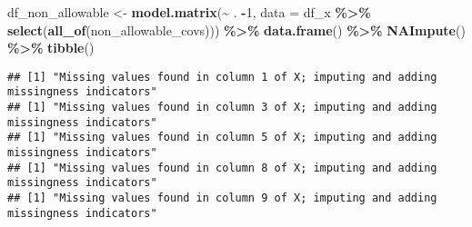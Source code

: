 \documentclass[
]{article}
\newenvironment{Shaded}{\begin{snugshade}}{\end{snugshade}}
\newcommand{\AttributeTok}[1]{\textcolor[rgb]{0.13,0.29,0.53}{#1}}
\newcommand{\DecValTok}[1]{\textcolor[rgb]{0.00,0.00,0.81}{#1}}
\newcommand{\FunctionTok}[1]{\textcolor[rgb]{0.13,0.29,0.53}{\textbf{#1}}}
\newcommand{\NormalTok}[1]{#1}
\newcommand{\OtherTok}[1]{\textcolor[rgb]{0.56,0.35,0.01}{#1}}
\newcommand{\SpecialCharTok}[1]{\textcolor[rgb]{0.81,0.36,0.00}{\textbf{#1}}}
\begin{document}
\begin{Shaded}
\begin{Highlighting}[]
\NormalTok{df\_non\_allowable }\OtherTok{\textless{}{-}} \FunctionTok{model.matrix}\NormalTok{(}\SpecialCharTok{\textasciitilde{}}\NormalTok{ . }\SpecialCharTok{{-}}\DecValTok{1}\NormalTok{, }\AttributeTok{data =}\NormalTok{ df\_x }\SpecialCharTok{\%\textgreater{}\%} \FunctionTok{select}\NormalTok{(}\FunctionTok{all\_of}\NormalTok{(non\_allowable\_covs))) }\SpecialCharTok{\%\textgreater{}\%} 
  \FunctionTok{data.frame}\NormalTok{() }\SpecialCharTok{\%\textgreater{}\%} \FunctionTok{NAImpute}\NormalTok{() }\SpecialCharTok{\%\textgreater{}\%} \FunctionTok{tibble}\NormalTok{()}
\end{Highlighting}
\end{Shaded}

\begin{verbatim}
## [1] "Missing values found in column 1 of X; imputing and adding missingness indicators"
## [1] "Missing values found in column 3 of X; imputing and adding missingness indicators"
## [1] "Missing values found in column 5 of X; imputing and adding missingness indicators"
## [1] "Missing values found in column 8 of X; imputing and adding missingness indicators"
## [1] "Missing values found in column 9 of X; imputing and adding missingness indicators"
\end{verbatim}
\end{document}
